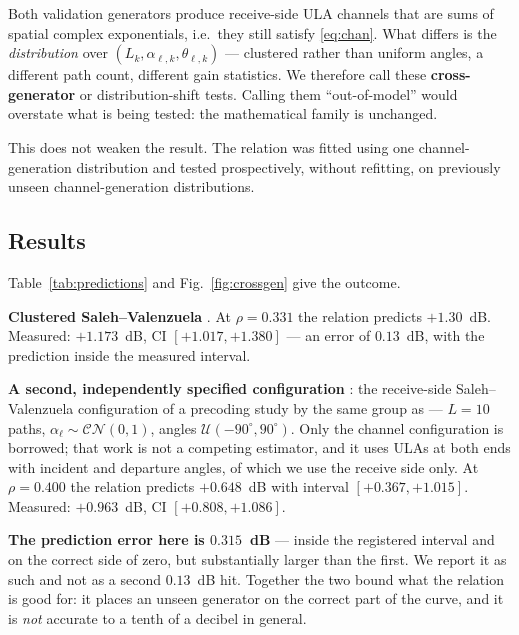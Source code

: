 \documentclass[journal]{IEEEtran}
\newcommand{\CN}{\mathcal{CN}}
\begin{document}
Both validation generators produce receive-side ULA channels that are sums of
spatial complex exponentials, i.e.\ they still satisfy \eqref{eq:chan}. What
differs is the \emph{distribution} over $(L_k,\alpha_{\ell,k},\theta_{\ell,k})$
--- clustered rather than uniform angles, a different path count, different
gain statistics. We therefore call these \textbf{cross-generator} or
distribution-shift tests. Calling them ``out-of-model'' would overstate what is
being tested: the mathematical family is unchanged.

This does not weaken the result. The relation was fitted using one
channel-generation distribution and tested prospectively, without refitting, on
previously unseen channel-generation distributions.

\subsection{Results}

Table~\ref{tab:predictions} and Fig.~\ref{fig:crossgen} give the outcome.

\textbf{Clustered Saleh--Valenzuela} \cite{meijerink2014}. At $\rho=0.331$ the
relation predicts $+1.30$~dB. Measured: $+1.173$~dB, CI $[+1.017,+1.380]$ ---
an error of $0.13$~dB, with the prediction inside the measured interval.

\textbf{A second, independently specified configuration} \cite{precoding2408}:
the receive-side Saleh--Valenzuela configuration of a precoding study by the
same group as \cite{cui2025} --- $L=10$ paths, $\alpha_\ell\sim\CN(0,1)$,
angles $\mathcal{U}(-90^\circ,90^\circ)$. Only the channel configuration is
borrowed; that work is not a competing estimator, and it uses ULAs at both ends
with incident and departure angles, of which we use the receive side only. At
$\rho=0.400$ the relation predicts $+0.648$~dB with interval
$[+0.367,+1.015]$. Measured: $+0.963$~dB, CI $[+0.808,+1.086]$.

\textbf{The prediction error here is $0.315$~dB} --- inside the registered
interval and on the correct side of zero, but substantially larger than the
first. We report it as such and not as a second $0.13$~dB hit. Together the two
bound what the relation is good for: it places an unseen generator on the
correct part of the curve, and it is \emph{not} accurate to a tenth of a
decibel in general.
\end{document}
